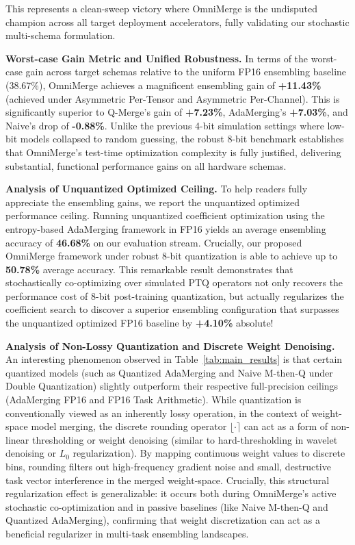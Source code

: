 This represents a clean-sweep victory where OmniMerge is the undisputed champion across all target deployment accelerators, fully validating our stochastic multi-schema formulation.

\textbf{Worst-case Gain Metric and Unified Robustness.}
In terms of the worst-case gain across target schemas relative to the uniform FP16 ensembling baseline (38.67\%), OmniMerge achieves a magnificent ensembling gain of \textbf{+11.43\%} (achieved under Asymmetric Per-Tensor and Asymmetric Per-Channel). This is significantly superior to Q-Merge's gain of \textbf{+7.23\%}, AdaMerging's \textbf{+7.03\%}, and Naive's drop of \textbf{-0.88\%}. Unlike the previous 4-bit simulation settings where low-bit models collapsed to random guessing, the robust 8-bit benchmark establishes that OmniMerge's test-time optimization complexity is fully justified, delivering substantial, functional performance gains on all hardware schemas.

\textbf{Analysis of Unquantized Optimized Ceiling.}
To help readers fully appreciate the ensembling gains, we report the unquantized optimized performance ceiling. Running unquantized coefficient optimization using the entropy-based AdaMerging framework in FP16 yields an average ensembling accuracy of \textbf{46.68\%} on our evaluation stream. Crucially, our proposed OmniMerge framework under robust 8-bit quantization is able to achieve up to \textbf{50.78\%} average accuracy. This remarkable result demonstrates that stochastically co-optimizing over simulated PTQ operators not only recovers the performance cost of 8-bit post-training quantization, but actually regularizes the coefficient search to discover a superior ensembling configuration that surpasses the unquantized optimized FP16 baseline by \textbf{+4.10\%} absolute!

\textbf{Analysis of Non-Lossy Quantization and Discrete Weight Denoising.}
An interesting phenomenon observed in Table~\ref{tab:main_results} is that certain quantized models (such as Quantized AdaMerging and Naive M-then-Q under Double Quantization) slightly outperform their respective full-precision ceilings (AdaMerging FP16 and FP16 Task Arithmetic). While quantization is conventionally viewed as an inherently lossy operation, in the context of weight-space model merging, the discrete rounding operator $\lfloor \cdot \rceil$ can act as a form of non-linear thresholding or weight denoising (similar to hard-thresholding in wavelet denoising or $L_0$ regularization). By mapping continuous weight values to discrete bins, rounding filters out high-frequency gradient noise and small, destructive task vector interference in the merged weight-space. Crucially, this structural regularization effect is generalizable: it occurs both during OmniMerge's active stochastic co-optimization and in passive baselines (like Naive M-then-Q and Quantized AdaMerging), confirming that weight discretization can act as a beneficial regularizer in multi-task ensembling landscapes.


